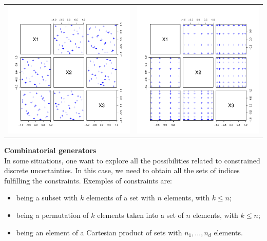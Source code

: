 {\begin{center}
\begin{tabular}{cc}
          \includegraphics[width=8cm]{Figures/Sobol_DOE.pdf} & \includegraphics[width=8cm]{Figures/Gauss_DOE.pdf}
        \end{tabular}
      \end{center}

      \vspace*{2mm}

      {\bf Combinatorial generators }\\

      In some situations, one want to explore all the possibilities related to constrained discrete uncertainties. In this case, we need to obtain all the sets of indices fulfilling the constraints. Exemples of constraints are:
      \begin{itemize}
      \item being a subset with $k$ elements of a set with $n$ elements, with $k\leq n$;
      \item being a permutation of $k$ elements taken into a set of $n$ elements, with $k\leq n$;
      \item being an element of a Cartesian product of sets with $n_1,\hdots,n_d$ elements.
      \end{itemize}

}
